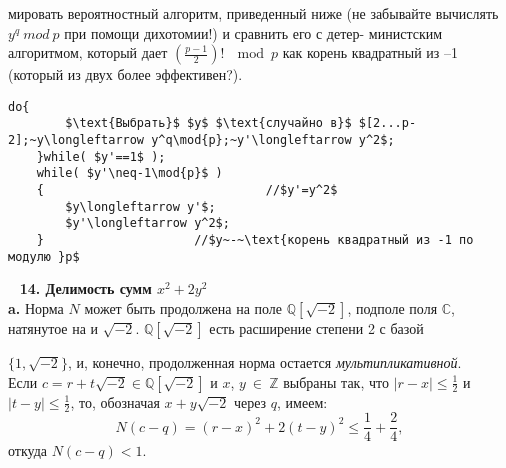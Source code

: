 \documentclass{mai_book}
\begin{document}
мировать вероятностный алгоритм, приведенный ниже (не забывайте\linebreak
вычислять $y^q~mod~p$ при помощи дихотомии!) и сравнить его с детер­-\linebreak
министским алгоритмом, который дает $(\frac{p-1}{2})!~\mod{p}$ как корень\linebreak 
ква­дратный из --1 (который из двух более эффективен?).\\
\begin{lstlisting}[mathescape=true,showspaces=false]
	do{
		$\text{Выбрать}$ $y$ $\text{случайно в}$ $[2...p-2];~y\longleftarrow y^q\mod{p};~y'\longleftarrow y^2$;
	}while( $y'==1$ );
	while( $y'\neq-1\mod{p}$ )
	{		 						//$y'=y^2$
		$y\longleftarrow y'$;
		$y'\longleftarrow y^2$;
	}     				  //$y~-~\text{корень квадратный из -1 по модулю }p$
\end{lstlisting}
\ \newline
\noindent\textbf{14. Делимость сумм $x^2+2y^2$} \newline 
\\
\hspace*{15pt}\textbf{a.} Норма $N$ может быть продолжена на поле $\mathbb{Q}[\sqrt{-2}]$, подполе поля\linebreak
$\mathbb{C}$,\: натянутое\: на\: и\:\: $\sqrt{-2}$.\:\: $\mathbb{Q}[\sqrt{-2}]$\:\: есть\: расширение\: степени 2 с базой%
\pagebreak
%

\noindent $\{1,\sqrt{-2}\}$, и, конечно, продолженная норма остается \textit{мультипликативной}.\\

Если $c=r+t\sqrt{-2}\in\mathbb{Q}[\sqrt{-2}]$ и $x$, $y~\in~\mathbb{Z}$ выбраны так, что $|r-x|\leqslant\frac{1}{2}$\linebreak
и $|t-y|\leqslant\frac{1}{2}$, то, обозначая $x+y\sqrt{-2}$ через $q$, имеем:
$$ N(c-q)=(r-x)^2+2(t-y)^2\leqslant\frac{1}{4}+\frac{2}{4},$$
откуда $N(c-q)<1$.
\end{document}

